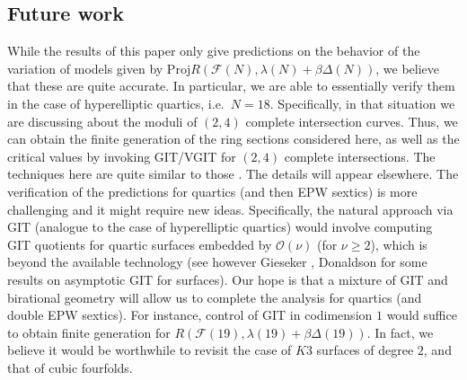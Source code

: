 \documentclass[11pt]{amsart}
\numberwithin{equation}{subsection}
\theoremstyle{plain}
\theoremstyle{remark}
\theoremstyle{definition}
\newcommand{\calO}{\mathcal{O}}
\newcommand{\Proj}{\mathrm{Proj}}
\newcommand{\cF}{{\mathscr F}}
\begin{document}
\subsection*{Future work} While the results of this paper only give predictions on the behavior of the variation of models given by $\Proj R(\cF(N), \lambda(N)+\beta\Delta(N))$, we believe that these are quite accurate. In particular, we are able to essentially verify them in the case of hyperelliptic quartics, i.e.~$N=18$. Specifically, in that situation we are discussing about the moduli of $(2,4)$ complete intersection curves. Thus, we can obtain the finite generation of the ring sections considered here, as well as the critical values by invoking GIT/VGIT for $(2,4)$ complete  intersections. The techniques here are quite similar to those \cite{g4git,g4ball}. The details will appear elsewhere. The verification of the predictions for quartics (and then EPW sextics) is more challenging and it might require new ideas. Specifically, the natural approach via GIT (analogue to the case of hyperelliptic quartics) would involve computing GIT quotients for quartic surfaces embedded by $\calO(\nu)$ (for $\nu\ge 2$), which is beyond the available technology (see however Gieseker \cite{gieseker}, Donaldson \cite{donaldson} for some results on asymptotic GIT for surfaces).  Our hope is that a mixture of GIT and birational geometry will allow us to complete the analysis for quartics (and double EPW sextics). For instance, control of GIT in codimension $1$ would suffice to obtain finite generation for $R(\cF(19), \lambda(19)+\beta \Delta(19))$. In fact, we believe it would be worthwhile to revisit the  case of $K3$ surfaces of degree $2$, and that of cubic fourfolds. 

\medskip
\end{document}
